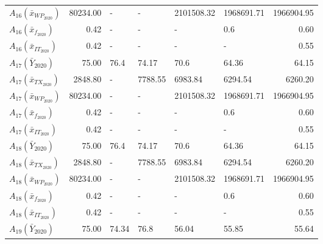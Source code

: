 \begin{tabular}{lrllllr}
$A_{16}(\bar{x}_{WP_{2020}})$ & 80234.00 &                   - &                   - &          2101508.32 &          1968691.71 &           1966904.95 \\
 $A_{16}(\bar{x}_{f_{2020}})$ &     0.42 &                   - &                   - &                   - &                 0.6 &                 0.60 \\
$A_{16}(\bar{x}_{IT_{2020}})$ &     0.42 &                   - &                   - &                   - &                   - &                 0.55 \\
     $A_{17}(\bar{Y}_{2020})$ &    75.00 &                76.4 &               74.17 &                70.6 &               64.36 &                64.15 \\
$A_{17}(\bar{x}_{TX_{2020}})$ &  2848.80 &                   - &             7788.55 &             6983.84 &             6294.54 &              6260.20 \\
$A_{17}(\bar{x}_{WP_{2020}})$ & 80234.00 &                   - &                   - &          2101508.32 &          1968691.71 &           1966904.95 \\
 $A_{17}(\bar{x}_{f_{2020}})$ &     0.42 &                   - &                   - &                   - &                 0.6 &                 0.60 \\
$A_{17}(\bar{x}_{IT_{2020}})$ &     0.42 &                   - &                   - &                   - &                   - &                 0.55 \\
     $A_{18}(\bar{Y}_{2020})$ &    75.00 &                76.4 &               74.17 &                70.6 &               64.36 &                64.15 \\
$A_{18}(\bar{x}_{TX_{2020}})$ &  2848.80 &                   - &             7788.55 &             6983.84 &             6294.54 &              6260.20 \\
$A_{18}(\bar{x}_{WP_{2020}})$ & 80234.00 &                   - &                   - &          2101508.32 &          1968691.71 &           1966904.95 \\
 $A_{18}(\bar{x}_{f_{2020}})$ &     0.42 &                   - &                   - &                   - &                 0.6 &                 0.60 \\
$A_{18}(\bar{x}_{IT_{2020}})$ &     0.42 &                   - &                   - &                   - &                   - &                 0.55 \\
     $A_{19}(\bar{Y}_{2020})$ &    75.00 &               74.34 &                76.8 &               56.04 &               55.85 &                55.64 \\

\end{tabular}
